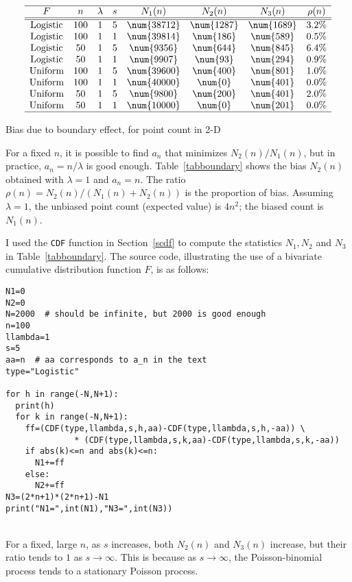 \documentclass[10pt]{article}
\begin{document}
\begin{table}%
\[
\begin{array}{cccccccc}
\hline
 F &  n & \lambda & s  & N_1(n) & N_2(n) & N_3(n) & \rho(n)\\
\hline
\hline
\mbox{Logistic} & 100 & 1 & 5 & \num{38712} & \num{1287} &  \num{1689}  &  3.2\% \\
\mbox{Logistic} & 100 & 1 & 1 & \num{39814} & \num{186} &  \num{589}  &  0.5\% \\
\mbox{Logistic} & 50 & 1 & 5 & \num{9356} & \num{644} &  \num{845}  &  6.4\% \\
\mbox{Logistic} & 50 & 1 & 1 & \num{9907} & \num{93} &  \num{294}  &  0.9\% \\

\mbox{Uniform} & 100 & 1 & 5 & \num{39600} & \num{400} &  \num{801}  &  1.0\% \\
\mbox{Uniform} & 100 & 1 & 1 & \num{40000} & \num{0} &  \num{401}  &  0.0\% \\
\mbox{Uniform} & 50 & 1 & 5 & \num{9800} & \num{200} &  \num{401}  &  2.0\% \\
\mbox{Uniform} & 50 & 1 & 1 & \num{10000} & \num{0} &  \num{201}  &  0.0\% \\
\hline
\end{array}
\]
\caption{\label{tabboundary}Bias due to boundary effect, for point count in 2-D}
\end{table}

\noindent For a fixed $n$, it is possible to find $a_n$ that minimizes
$N_2(n)/N_1(n)$, but in practice, $a_n=n/\lambda$ is good enough. Table~\ref{tabboundary} shows the bias $N_2(n)$ obtained with $\lambda=1$ and $a_n=n$.
The ratio $\rho(n)=N_2(n)/(N_1(n)+N_2(n))$ is the proportion of bias. Assuming $\lambda=1$, the unbiased point count (expected value) is $4n^2$; the biased count is $N_1(n)$.

I used the \texttt{CDF} function in Section~\ref{scdf} to compute the statistics $N_1, N_2$ and $N_3$ in Table~\ref{tabboundary}. The source code, illustrating the use of
a bivariate cumulative distribution function $F$,  is as follows: \vspace{1ex}
\quad \\
\begin{lstlisting}
N1=0
N2=0
N=2000  # should be infinite, but 2000 is good enough
n=100
llambda=1
s=5
aa=n  # aa corresponds to a_n in the text
type="Logistic"

for h in range(-N,N+1):
  print(h)
  for k in range(-N,N+1):
    ff=(CDF(type,llambda,s,h,aa)-CDF(type,llambda,s,h,-aa)) \
              * (CDF(type,llambda,s,k,aa)-CDF(type,llambda,s,k,-aa))
    if abs(k)<=n and abs(k)<=n:
      N1+=ff
    else:
      N2+=ff
N3=(2*n+1)*(2*n+1)-N1
print("N1=",int(N1),"N3=",int(N3))
\end{lstlisting}
\quad \\
\noindent  For a fixed, large $n$, as $s$ increases, both $N_2(n)$ and $N_3(n)$ increase, but their ratio tends to $1$ as $s\rightarrow\infty$. This is because
as $s\rightarrow\infty$, the Poisson-binomial process tends to a stationary Poisson process.
\end{document}
